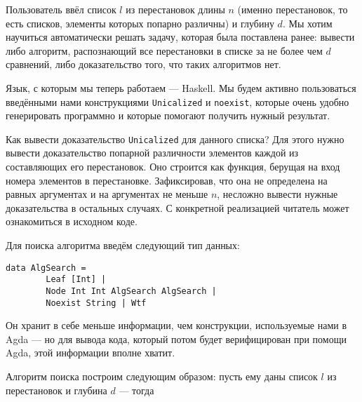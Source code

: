 


\abz Пользователь ввёл список $l$ из перестановок длины $n$ (именно перестановок, то есть списков, элементы которых попарно различны) и глубину $d$. Мы хотим научиться автоматически решать задачу, которая была поставлена ранее: вывести либо алгоритм, распознающий все перестановки в списке за не более чем $d$ сравнений, либо доказательство того, что таких алгоритмов нет.

\abz Язык, с которым мы теперь работаем — Haskell. Мы будем активно пользоваться введёнными нами конструкциями {\tt Unicalized} и {\tt noexist}, которые очень удобно генерировать программно и которые помогают получить нужный результат.

\abz Как вывести доказательство {\tt Unicalized} для данного списка? Для этого нужно вывести доказательство попарной различности элементов каждой из составляющих его перестановок. Оно строится как функция, берущая на вход номера элементов в перестановке. Зафиксировав, что она не определена на равных аргументах и на аргументах не меньше $n$, несложно вывести нужные доказательства в остальных случаях. С конкретной реализацией читатель может ознакомиться в исходном коде.

\abz Для поиска алгоритма введём следующий тип данных:

\begin{verbatim}
data AlgSearch =
        Leaf [Int] |
        Node Int Int AlgSearch AlgSearch |
        Noexist String | Wtf
\end{verbatim}

\abz Он хранит в себе меньше информации, чем конструкции, используемые нами в Agda — но для вывода кода, который потом будет верифицирован при помощи Agda, этой информации вполне хватит.

\abz Алгоритм поиска построим следующим образом: пусть ему даны список $l$ из перестановок и глубина $d$ — тогда

